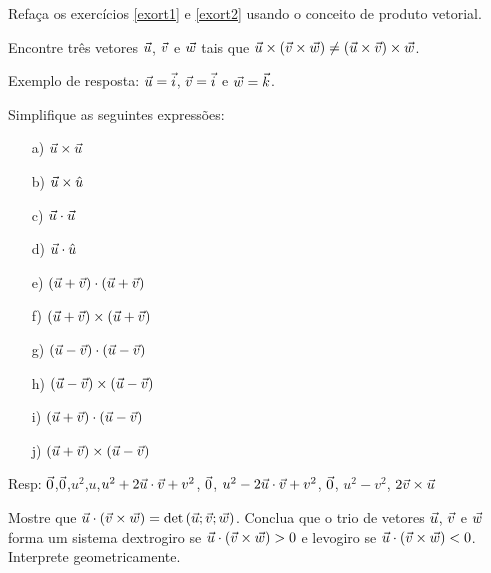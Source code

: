 \begin{prob} Refaça os exercícios \ref{exort1} e \ref{exort2} usando o conceito de produto vetorial.
\end{prob}

\begin{prob}\label{prodvecnaoassoc} Encontre três vetores $\vec{u}$, $\vec{v}$ e $\vec{w}$ tais que $\vec{u}\times\left(\vec{v}\times\vec{w}\right)\neq \left(\vec{u}\times\vec{v}\right)\times \vec{w}$. 
\end{prob}
Exemplo de resposta: $\vec{u}=\vec{i}$, $\vec{v}=\vec{i}$ e $\vec{w}=\vec{k}$.

\begin{prob} Simplifique as seguintes expressões:
\begin{itemize}
\item[a)] $\vec{u}\times\vec{u}$
\item[b)] $\vec{u}\times\hat{u}$
\item[c)] $\vec{u}\cdot\vec{u}$
\item[d)] $\vec{u}\cdot\hat{u}$
\item[e)] $\left(\vec{u}+\vec{v}\right)\cdot\left(\vec{u}+\vec{v}\right)$
\item[f)] $\left(\vec{u}+\vec{v}\right)\times\left(\vec{u}+\vec{v}\right)$
\item[g)] $\left(\vec{u}-\vec{v}\right)\cdot\left(\vec{u}-\vec{v}\right)$
\item[h)] $\left(\vec{u}-\vec{v}\right)\times\left(\vec{u}-\vec{v}\right)$
\item[i)] $\left(\vec{u}+\vec{v}\right)\cdot\left(\vec{u}-\vec{v}\right)$
\item[j)] $\left(\vec{u}+\vec{v}\right)\times\left(\vec{u}-\vec{v}\right)$
\end{itemize}
\end{prob}
Resp: $\vec{0}$,$\vec{0}$,$u^2$,$u$,$u^2+2\vec{u}\cdot\vec{v}+v^2$, $\vec{0}$, $u^2-2\vec{u}\cdot\vec{v}+v^2$, $\vec{0}$, $u^2-v^2$, $2\vec{v}\times\vec{u}$ 


\begin{prob} Mostre que $\vec{u}\cdot \left(\vec{v}\times\vec{w}\right)=\det\left(\vec{u};\vec{v};\vec{w}\right)$. Conclua que o trio de vetores $\vec{u}$, $\vec{v}$ e $\vec{w}$ forma um sistema dextrogiro se $\vec{u}\cdot \left(\vec{v}\times\vec{w}\right)>0$ e levogiro se $\vec{u}\cdot \left(\vec{v}\times\vec{w}\right)<0$. Interprete geometricamente.
\end{prob}


